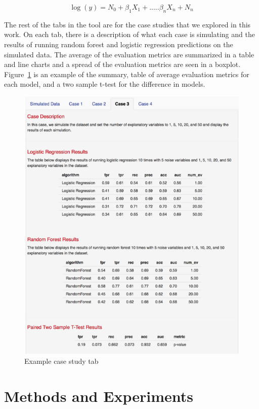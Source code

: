 \documentclass{llncs}
\begin{document}
\begin{equation}
\log(y) = N_{0} + \beta_{1}X_{1} + .....\beta_{n}X_{n} + N_{n} 
\end{equation}

The rest of the tabs in the tool are for the case studies that we explored in this work.  On each tab, there is a description of what each case is simulating and the results of running random forest and logistic regression predictions on the simulated data.  The average of the evaluation metrics are summarized in a table and line charts and a spread of the evaluation metrics are seen in a boxplot. Figure~\ref{fig:center} is an example of the summary, table of average evaluation metrics for each model, and a two sample t-test for the difference in models.

\begin{figure}
\centering
\includegraphics[scale=0.75]{center.png}
\caption{Example case study tab}
\label{fig:center}
\end{figure}

\section{Methods and Experiments}
\end{document}

